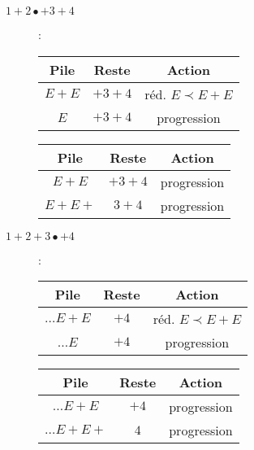 \documentclass{article}
\begin{document}
\begin{enumerate}
    \begin{description}
        \item[$1+2\bullet+3+4$]:\\
        \begin{table}[h!]
            \begin{minipage}[t]{.4\linewidth}
                \begin{tabular}{c|c|c}
                    Pile & Reste & Action \\
                    \hline
                    $E+E$ & $+3+4$ & réd. $E \prec E + E$ \\
                    $E$ & $+3+4$ & progression
                \end{tabular}
            \end{minipage}
            \hfill
            \begin{minipage}[t]{.4\linewidth}
                \begin{tabular}{c|c|c}
                    Pile & Reste & Action \\
                    \hline
                    $E+E$ & $+3+4$ & progression \\
                    $E+E+$ & $3+4$ & progression
                \end{tabular}
            \end{minipage}
        \end{table}

        \item[$1+2+3\bullet+4$]:\\
        \begin{table}[h!]
            \begin{minipage}[t]{.4\linewidth}
                \begin{tabular}{c|c|c}
                    Pile & Reste & Action \\
                    \hline
                    $\ldots E + E$ & $+4$ & réd. $E \prec E + E$ \\
                    $\ldots E$ & $+4$ & progression \\
                \end{tabular}
            \end{minipage}
            \hfill
            \begin{minipage}[t]{.4\linewidth}
                \begin{tabular}{c|c|c}
                    Pile & Reste & Action \\
                    \hline
                    $\ldots E + E$ & $+4$ & progression \\
                    $\ldots E + E +$ & $4$ & progression \\
                \end{tabular}
            \end{minipage}
        \end{table}


\end{description}
\end{enumerate}
\end{document}
